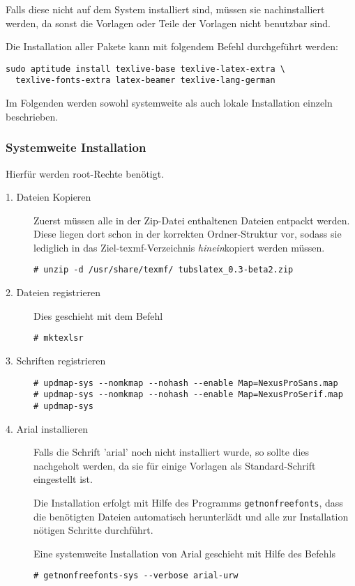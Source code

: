 Falls diese nicht auf dem System installiert sind, müssen sie nachinstalliert
werden, da sonst die Vorlagen oder Teile der Vorlagen nicht benutzbar sind.

Die Installation aller Pakete kann mit folgendem Befehl durchgeführt werden:
\begin{lstlisting}[style=cmd]
sudo aptitude install texlive-base texlive-latex-extra \
  texlive-fonts-extra latex-beamer texlive-lang-german
\end{lstlisting}

Im Folgenden werden sowohl systemweite als auch lokale Installation einzeln
beschrieben.

\subsubsection{Systemweite Installation}

\begin{important}
  Hierfür werden root-Rechte benötigt.
\end{important}

\begin{description}
  \item[1. Dateien Kopieren] Zuerst müssen alle in der Zip-Datei enthaltenen
    Dateien entpackt werden.
    Diese liegen dort schon in der korrekten Ordner-Struktur vor, sodass
    sie lediglich in das Ziel-texmf-Verzeichnis \emph{hinein}kopiert werden
    müssen.
    \begin{lstlisting}[style=cmd]
# unzip -d /usr/share/texmf/ tubslatex_0.3-beta2.zip
    \end{lstlisting}

  \item[2. Dateien registrieren]
    Dies geschieht mit dem Befehl
    \begin{lstlisting}[style=cmd]
# mktexlsr
    \end{lstlisting}

  \item[3. Schriften registrieren]\hfill

    \begin{lstlisting}[style=cmd]
# updmap-sys --nomkmap --nohash --enable Map=NexusProSans.map
# updmap-sys --nomkmap --nohash --enable Map=NexusProSerif.map
# updmap-sys
    \end{lstlisting}
    
  \item[4. Arial installieren]
    Falls die Schrift 'arial' noch nicht installiert wurde, so sollte dies
    nachgeholt werden, da sie für einige Vorlagen als Standard-Schrift
    eingestellt ist.
    
    Die Installation erfolgt mit Hilfe des Programms \lstinline{getnonfreefonts},
    dass die benötigten Dateien automatisch herunterlädt und alle zur Installation
    nötigen Schritte durchführt.
    
    Eine systemweite Installation von Arial geschieht mit Hilfe des Befehls
    \begin{lstlisting}[style=cmd]
# getnonfreefonts-sys --verbose arial-urw
    \end{lstlisting}
    
\end{description}

